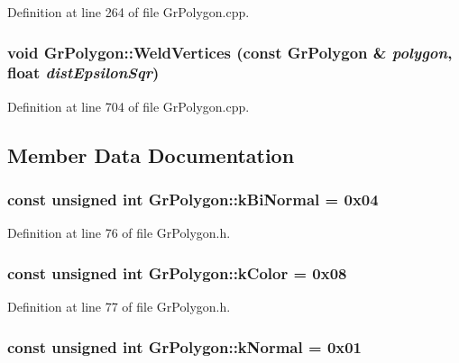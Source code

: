 \begin{CompactItemize}
Definition at line 264 of file GrPolygon.cpp.\hypertarget{class_gr_polygon_d590f512fd5dc8ff24377ed123df129a}{
\subsubsection[{WeldVertices}]{\setlength{\rightskip}{0pt plus 5cm}void GrPolygon::WeldVertices (const {\bf GrPolygon} \& {\em polygon}, \/  float {\em distEpsilonSqr})}}
\label{class_gr_polygon_d590f512fd5dc8ff24377ed123df129a}




Definition at line 704 of file GrPolygon.cpp.

\subsection{Member Data Documentation}
\hypertarget{class_gr_polygon_8649525f9a18567bd50c87ab9436a9d9}{
\subsubsection[{kBiNormal}]{\setlength{\rightskip}{0pt plus 5cm}const unsigned int {\bf GrPolygon::kBiNormal} = 0x04}}
\label{class_gr_polygon_8649525f9a18567bd50c87ab9436a9d9}




Definition at line 76 of file GrPolygon.h.\hypertarget{class_gr_polygon_438f9ff37f015e22bd8e48f94637b766}{
\subsubsection[{kColor}]{\setlength{\rightskip}{0pt plus 5cm}const unsigned int {\bf GrPolygon::kColor} = 0x08}}
\label{class_gr_polygon_438f9ff37f015e22bd8e48f94637b766}




Definition at line 77 of file GrPolygon.h.\hypertarget{class_gr_polygon_f85991824f91a6724771e1ace01f1caf}{
\subsubsection[{kNormal}]{\setlength{\rightskip}{0pt plus 5cm}const unsigned int {\bf GrPolygon::kNormal} = 0x01}}
\label{class_gr_polygon_f85991824f91a6724771e1ace01f1caf}





\end{CompactItemize}
